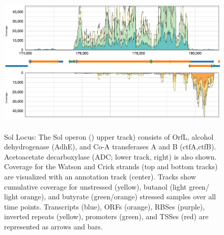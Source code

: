 \begin{figure}
\small
{\includegraphics[width=\textwidth,height=2.5in]{images/Assembly/Sol/Sol-locus.png}
\label{fig:1a}}


\caption{Sol Locus: The Sol operon () upper track) consists of OrfL, alcohol dehydrogenase (AdhE), and Co-A transferases A and B (ctfA,ctfB). Acetoacetate decarboxylase (ADC;  lower track, right) is also shown. Coverage for the Watson and Crick strands (top and bottom tracks) are visualized with an annotation track (center). Tracks show cumulative coverage for unstressed (yellow), butanol (light green/ light orange), and butyrate (green/orange) stressed samples over all time points. Transcripts (blue), ORFs (orange), RBSes (purple), inverted repeats (yellow), promoters (green), and TSSes (red) are represented as arrows and bars.}
\end{figure}
